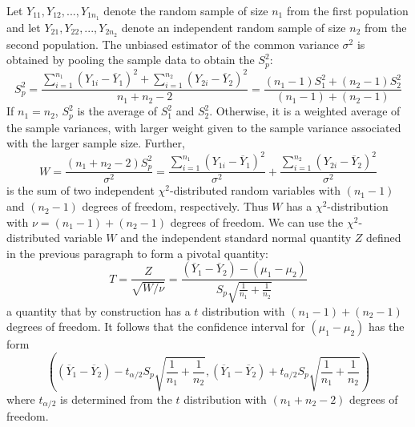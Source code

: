 \documentclass[12pt, a4paper, twoside, openright, titlepage]{book}
\begin{document}
Let $Y_{11},Y_{12},...,Y_{1n_1}$ denote the random sample of size $n_1$ from the first population and let $Y_{21},Y_{22},...,Y_{2n_2}$ denote an independent random sample of size $n_2$ from the second population. The unbiased estimator of the common variance $\sigma^2$ is obtained by pooling the sample data to obtain the  $S_p^2$: \begin{equation*}
    S_p^2 = \frac{\sum_{i=1}^{n_1}(Y_{1i} - \overline{Y}_1)^2 + \sum_{i=1}^{n_2}(Y_{2i}-\overline{Y}_2)^2}{n_1+n_2-2} = \frac{(n_1 - 1)S_1^2 + (n_2-1)S_2^2}{(n_1 - 1) + (n_2 - 1)}
\end{equation*}
If $n_1 = n_2$, $S_p^2$ is the average of $S_1^2$ and $S_2^2$. Otherwise, it is a weighted average of the sample variances, with larger weight given to the sample variance associated with the larger sample size. Further, \begin{equation*}
    W = \frac{(n_1+n_2-2)S_p^2}{\sigma^2} = \frac{\sum_{i=1}^{n_1}(Y_{1i}-\overline{Y}_1)^2}{\sigma^2} + \frac{\sum_{i=1}^{n_2}(Y_{2i}-\overline{Y}_2)^2}{\sigma^2}
\end{equation*}
is the sum of two independent $\chi^2$-distributed random variables with $(n_1-1)$ and $(n_2-1)$ degrees of freedom, respectively. Thus $W$ has a $\chi^2$-distribution with $\nu = (n_1-1)+(n_2-1)$ degrees of freedom. We can use the $\chi^2$-distributed variable $W$ and the independent standard normal quantity $Z$ defined in the previous paragraph to form a pivotal quantity: \begin{equation*}
    T = \frac{Z}{\sqrt{W/\nu}} = \frac{(\overline{Y}_1-\overline{Y}_2) - (\mu_1-\mu_2)}{S_p\sqrt{\frac{1}{n_1} + \frac{1}{n_2}}}
\end{equation*}
a quantity that by construction has a $t$ distribution with $(n_1 - 1) + (n_2 - 1)$ degrees of freedom. It follows that the confidence interval for $(\mu_1 - \mu_2)$ has the form \begin{equation*}
    \left((\overline{Y}_1 - \overline{Y}_2) - t_{\alpha/2}S_p\sqrt{\frac{1}{n_1} + \frac{1}{n_2}}, (\overline{Y}_1 - \overline{Y}_2) + t_{\alpha/2}S_p\sqrt{\frac{1}{n_1} + \frac{1}{n_2}}\right)
\end{equation*}
where $t_{\alpha/2}$ is determined from the $t$ distribution with $(n_1 + n_2 - 2)$ degrees of freedom.
\end{document}
